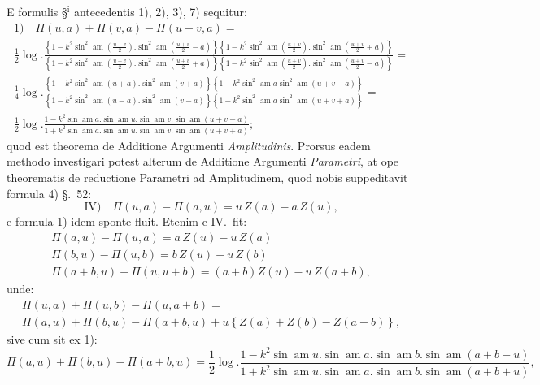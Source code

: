 \documentclass{article}
\begin{document}
E formulis §$^{\mathrm{i}}$ antecedentis 1), 2), 3), 7) sequitur:
\[
\begin{gathered}
\text{1)}\quad \Pi(u,a)+\Pi(v,a)-\Pi(u+v,a)=\\[1.5ex]
\frac{1}{2}\log.\frac{\left\{1-k^{2}\sin^{2}\operatorname{am}\left(\frac{u-v}{2}\right).\sin^{2}\operatorname{am}\left(\frac{u+v}{2}-a\right)\right\}\left\{1-k^{2}\sin^{2}\operatorname{am}\left(\frac{u+v}{2}\right).\sin^{2}\operatorname{am}\left(\frac{u+v}{2}+a\right)\right\}}{\left\{1-k^{2}\sin^{2}\operatorname{am}\left(\frac{u-v}{2}\right).\sin^{2}\operatorname{am}\left(\frac{u+v}{2}+a\right)\right\}\left\{1-k^{2}\sin^{2}\operatorname{am}\left(\frac{u+v}{2}\right).\sin^{2}\operatorname{am}\left(\frac{u+v}{2}-a\right)\right\}}=\\[1.5ex]
\frac{1}{4}\log.\frac{\left\{1-k^{2}\sin^{2}\operatorname{am}(u+a).\sin^{2}\operatorname{am}(v+a)\right\}\left\{1-k^{2}\sin^{2}\operatorname{am}a\sin^{2}\operatorname{am}(u+v-a)\right\}}{\left\{1-k^{2}\sin^{2}\operatorname{am}(u-a).\sin^{2}\operatorname{am}(v-a)\right\}\left\{1-k^{2}\sin^{2}\operatorname{am}a\sin^{2}\operatorname{am}(u+v+a)\right\}}=\\[1.5ex]
\frac{1}{2}\log.\frac{1-k^{2}\sin\operatorname{am}a.\sin\operatorname{am}u.\sin\operatorname{am}v.\sin\operatorname{am}(u+v-a)}{1+k^{2}\sin\operatorname{am}a.\sin\operatorname{am}u.\sin\operatorname{am}v.\sin\operatorname{am}(u+v+a)};
\end{gathered}
\]
quod est theorema de Additione Argumenti \emph{Amplitudinis}. Prorsus eadem methodo investigari potest alterum de Additione Argumenti \emph{Parametri}, at ope theorematis de reductione Parametri ad Amplitudinem, quod nobis suppeditavit formula 4) §.\ 52:
\[
\text{IV)}\quad \Pi(u,a)-\Pi(a,u)=u\,Z(a)-a\,Z(u),
\]
e formula 1) idem sponte fluit. Etenim e IV.\ fit:
\[
\begin{gathered}
\Pi(a,u)-\Pi(u,a)=a\,Z(u)-u\,Z(a)\\
\Pi(b,u)-\Pi(u,b)=b\,Z(u)-u\,Z(b)\\
\Pi(a+b,u)-\Pi(u,u+b)=(a+b)Z(u)-u\,Z(a+b),
\end{gathered}
\]
unde:
\[
\begin{gathered}
\Pi(u,a)+\Pi(u,b)-\Pi(u,a+b)=\\
\Pi(a,u)+\Pi(b,u)-\Pi(a+b,u)+u\left\{Z(a)+Z(b)-Z(a+b)\right\},
\end{gathered}
\]
sive cum sit ex 1):
\[
\Pi(a,u)+\Pi(b,u)-\Pi(a+b,u)=\frac{1}{2}\log.\frac{1-k^{2}\sin\operatorname{am}u.\sin\operatorname{am}a.\sin\operatorname{am}b.\sin\operatorname{am}(a+b-u)}{1+k^{2}\sin\operatorname{am}u.\sin\operatorname{am}a.\sin\operatorname{am}b.\sin\operatorname{am}(a+b+u)},
\]
\end{document}
